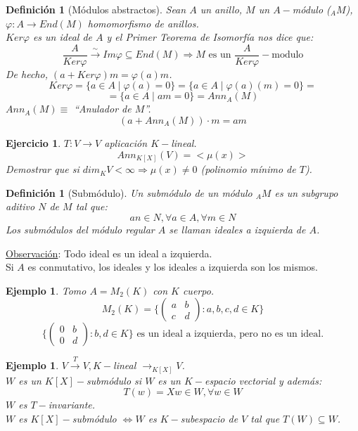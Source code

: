 \documentclass[11pt,a4paper]{article}
\theoremstyle{break}
\newtheorem{example}[theorem]{Ejemplo}
\newtheorem{definition}[theorem]{Definición}
\newtheorem{task}[theorem]{Ejercicio}
\begin{document}
\begin{definition}[Módulos abstractos]
Sean $A$ un anillo, $M$ un $A-$módulo ($_{A}M$), $\varphi: A \to End(M)$ homomorfismo de anillos. \\
$Ker \varphi$ es un ideal de $A$ y el Primer Teorema de Isomorfía nos dice que:
$$\frac{A}{Ker \varphi} \overset{\sim}{\to} Im \varphi \subseteq End(M) \Rightarrow M \text{ es un } \frac{A}{Ker \varphi}-\text{modulo}$$
De hecho, $(a + Ker \varphi)m = \varphi(a)m$.
$$Ker \varphi = \{a \in A \mid \varphi(a) = 0\} = \{a \in A \mid \varphi(a)(m) = 0\} =$$
$$= \{a \in A \mid am = 0\} = Ann_{A}(M)$$
$Ann_{A}(M) \equiv$ ``Anulador de $M$''.
$$(a + Ann_{A}(M)) \cdot m = am$$
\end{definition}

\begin{task}
$T: V \to V$ aplicación $K-$lineal.
$$Ann_{K[X]}(V) = <\mu(x)>$$
Demostrar que si $dim_{K}V < \infty \Rightarrow \mu(x) \neq 0$ (polinomio mínimo de $T$).
\end{task}

\begin{definition}[Submódulo]
Un submódulo de un módulo $_{A}M$ es un subgrupo aditivo $N$ de $M$ tal que:
$$an \in N, \forall a \in A, \forall m \in N$$
Los submódulos del módulo regular $A$ se llaman ideales a izquierda de $A$.
\end{definition}

\underline{Observación}: Todo ideal es un ideal a izquierda. \\
Si $A$ es conmutativo, los ideales y los ideales a izquierda son los mismos.

\begin{example}
Tomo $A = M_{2}(K)$ con $K$ cuerpo. 
\begin{equation*}
M_{2}(K) = \{
\begin{pmatrix}
a & b \\
c & d
\end{pmatrix}
: a, b, c, d \in K\}
\end{equation*}
\begin{equation*}
\{
\begin{pmatrix}
0 & b \\
0 & d
\end{pmatrix}
: b, d \in K\} \text{ es un ideal a izquierda, pero no es un ideal.}
\end{equation*}
\end{example}

\begin{example}
$V \overset{T}{\to}V, K-$lineal $\rightarrow_{K[X]}V$. \\
$W$ es un $K[X]-$submódulo si $W$ es un $K-$espacio vectorial y además:
$$T(w) = Xw \in W, \forall w \in W$$
$W$ es $T-$invariante. \\
$W$ es $K[X]-$submódulo $\iff W$ es $K-$subespacio de $V$ tal que $T(W) \subseteq W$.
\end{example}
\end{document}
